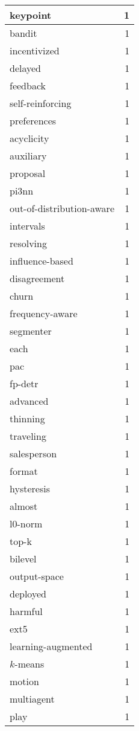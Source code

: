 \begin{table}[h]
\begin{tabular}{|l|r|}
\hline
keypoint & 1 \\
\hline
bandit & 1 \\
\hline
incentivized & 1 \\
\hline
delayed & 1 \\
\hline
feedback & 1 \\
\hline
self-reinforcing & 1 \\
\hline
preferences & 1 \\
\hline
acyclicity & 1 \\
\hline
auxiliary & 1 \\
\hline
proposal & 1 \\
\hline
pi3nn & 1 \\
\hline
out-of-distribution-aware & 1 \\
\hline
intervals & 1 \\
\hline
resolving & 1 \\
\hline
influence-based & 1 \\
\hline
disagreement & 1 \\
\hline
churn & 1 \\
\hline
frequency-aware & 1 \\
\hline
segmenter & 1 \\
\hline
each & 1 \\
\hline
pac & 1 \\
\hline
fp-detr & 1 \\
\hline
advanced & 1 \\
\hline
thinning & 1 \\
\hline
traveling & 1 \\
\hline
salesperson & 1 \\
\hline
format & 1 \\
\hline
hysteresis & 1 \\
\hline
almost & 1 \\
\hline
l0-norm & 1 \\
\hline
top-k & 1 \\
\hline
bilevel & 1 \\
\hline
output-space & 1 \\
\hline
deployed & 1 \\
\hline
harmful & 1 \\
\hline
ext5 & 1 \\
\hline
learning-augmented & 1 \\
\hline
$k$-means & 1 \\
\hline
motion & 1 \\
\hline
multiagent & 1 \\
\hline
play & 1 \\

\end{tabular}
\end{table}
